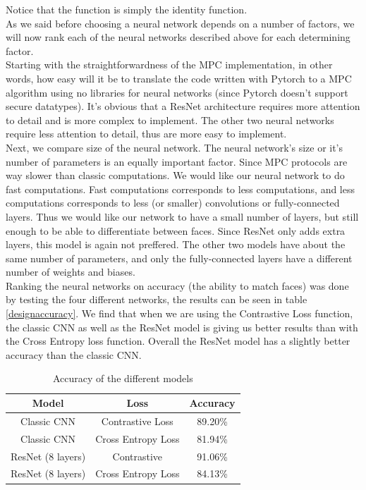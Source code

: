 Notice that the  function is simply the identity function.\\

As we said before choosing a neural network depends on a number of factors, we will now rank each of the neural networks described above for each determining factor.\\

Starting with the straightforwardness of the MPC implementation, in other words, how easy will it be to translate the code written with Pytorch to a MPC algorithm using no libraries for neural networks (since Pytorch doesn't support secure datatypes). It's obvious that a ResNet architecture requires more attention to detail and is more complex to implement. The other two neural networks require less attention to detail, thus are more easy to implement.\\

Next, we compare size of the neural network. The neural network's size or it's number of parameters is an equally important factor. Since MPC protocols are way slower than classic computations. We would like our neural network to do fast computations. Fast computations corresponds to less computations, and less computations corresponds to less (or smaller) convolutions or fully-connected layers. Thus we would like our network to have a small number of layers, but still enough to be able to differentiate between faces. Since ResNet only adds extra layers, this model is again not preffered. The other two models have about the same number of parameters, and only the fully-connected layers have a different number of weights and biases.\\

Ranking the neural networks on accuracy (the ability to match faces) was done by testing the four different networks, the results can be seen in table \ref{designaccuracy}. We find that when we are using the Contrastive Loss function, the classic CNN as well as the ResNet model is giving us better results than with the Cross Entropy loss function. Overall the ResNet model has a slightly better accuracy than the classic CNN.


\begin{table}[H]
\centering
\begin{tabular}{||c c c||}
 \hline
 Model & Loss & Accuracy \\ [0.5ex]
 \hline\hline
 Classic CNN  & Contrastive Loss & 89.20\% \\
 Classic CNN  & Cross Entropy Loss & 81.94\% \\
 ResNet (8 layers)  & Contrastive & 91.06\% \\
 ResNet (8 layers)  & Cross Entropy Loss & 84.13\% \\
 \hline
\end{tabular}
\caption{Accuracy of the different models}
\label{table:designaccuracy}
\end{table}

